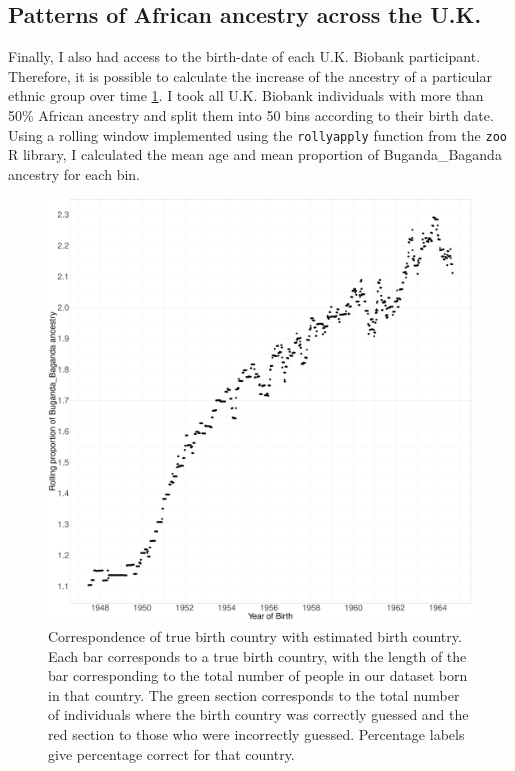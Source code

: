 \subsection{Patterns of African ancestry across the U.K.}

Finally, I also had access to the birth-date of each U.K. Biobank participant. Therefore, it is possible to calculate the increase of the ancestry of a particular ethnic group over time \ref{fig:rollingaverage_time_Buganda_ancestry}. I took all U.K. Biobank individuals with more than 50\% African ancestry and split them into 50 bins according to their birth date. Using a rolling window implemented using the \texttt{rollyapply} function from the \texttt{zoo} R library, I calculated the mean age and mean proportion of Buganda\_Baganda ancestry for each bin. 

\begin{figure}[htp]
    \centering
    \includegraphics[width=1.0\textwidth]{../images/chapter3/rollingaverage_time_Buganda_ancestry.pdf}
    \caption{Correspondence of true birth country with estimated birth country. Each bar corresponds to a true birth country, with the length of the bar corresponding to the total number of people in our dataset born in that country. The green section corresponds to the total number of individuals where the birth country was correctly guessed and the red section to those who were incorrectly guessed. Percentage labels give percentage correct for that country.}
    \label{fig:rollingaverage_time_Buganda_ancestry}
\end{figure}


